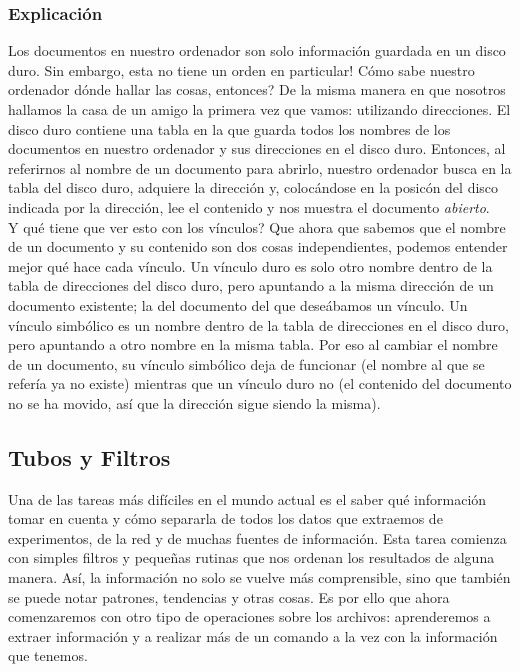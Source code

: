 \documentclass[10pt,letterpaper]{article}
\begin{document}
\subsubsection{Explicaci\'on}
Los documentos en nuestro ordenador son solo informaci\'on guardada en un disco duro. Sin embargo, esta no tiene un orden en particular! C\'omo sabe nuestro ordenador d\'onde hallar las cosas, entonces? De la misma manera en que nosotros hallamos la casa de un amigo la primera vez que vamos: utilizando direcciones. El disco duro contiene una tabla en la que guarda todos los nombres de los documentos en nuestro ordenador y sus direcciones en el disco duro. Entonces, al referirnos al nombre de un documento para abrirlo, nuestro ordenador busca en la tabla del disco duro, adquiere la direcci\'on y, coloc\'andose en la posic\'on del disco indicada por la direcci\'on, lee el contenido y nos muestra el documento \emph{abierto}.\\

Y qu\'e tiene que ver esto con los v\'inculos? Que ahora que sabemos que el nombre de un documento y su contenido son dos cosas independientes, podemos entender mejor qu\'e hace cada v\'inculo. Un v\'inculo duro es solo otro nombre dentro de la tabla de direcciones del disco duro, pero apuntando a la misma direcci\'on de un documento existente; la del documento del que dese\'abamos un v\'inculo. Un v\'inculo simb\'olico es un nombre dentro de la tabla de direcciones en el disco duro, pero apuntando a otro nombre en la misma tabla. Por eso al cambiar el nombre de un documento, su v\'inculo simb\'olico deja de funcionar (el nombre al que se refer\'ia ya no existe) mientras que un v\'inculo duro no (el contenido del documento no se ha movido, as\'i que la direcci\'on sigue siendo la misma).

\subsection{Tubos y Filtros}
Una de las tareas m\'as dif\'iciles en el mundo actual es el saber qu\'e informaci\'on tomar en cuenta y c\'omo separarla de todos los datos que extraemos de experimentos, de la red y de muchas fuentes de informaci\'on. Esta tarea comienza con simples filtros y peque\~nas rutinas que nos ordenan los resultados de alguna manera. As\'i, la informaci\'on no solo se vuelve m\'as comprensible, sino que tambi\'en se puede notar patrones, tendencias y otras cosas. Es por ello que ahora comenzaremos con otro tipo de operaciones sobre los archivos: aprenderemos a extraer informaci\'on y a realizar m\'as de un comando a la vez con la informaci\'on que tenemos.
\end{document}
